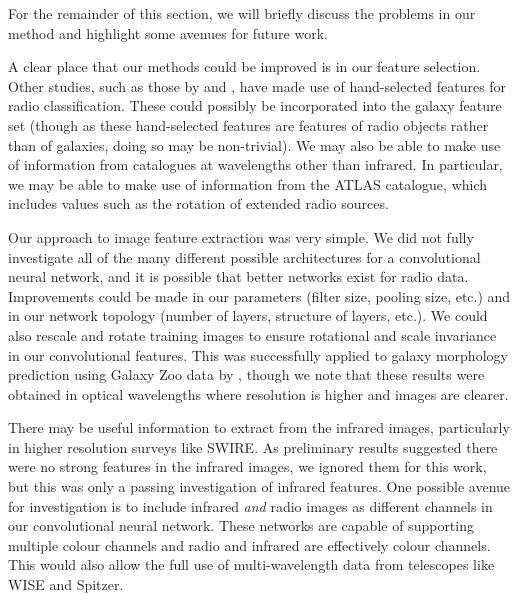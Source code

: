 
  For the remainder of this section, we will briefly discuss the problems in our
  method and highlight some avenues for future work.

  A clear place that our methods could be improved is in our feature selection.
  Other studies, such as those by \citet{proctor06} and \citet{fan15}, have made
  use of hand-selected features for radio classification. These could possibly
  be incorporated into the galaxy feature set (though as these hand-selected
  features are features of radio objects rather than of galaxies, doing so may
  be non-trivial). We may also be able to make use of information from
  catalogues at wavelengths other than infrared. In particular, we may be able
  to make use of information from the ATLAS catalogue, which includes values
  such as the rotation of extended radio sources.

  Our approach to image feature extraction was very simple. We did not fully
  investigate all of the many different possible architectures for a
  convolutional neural network, and it is possible that better networks exist
  for radio data. Improvements could be made in our parameters (filter size,
  pooling size, etc.) and in our network topology (number of layers, structure
  of layers, etc.). We could also rescale and rotate training images to ensure
  rotational and scale invariance in our convolutional features. This was
  successfully applied to galaxy morphology prediction using Galaxy Zoo data by
  \citet{dieleman15}, though we note that these results were obtained in optical
  wavelengths where resolution is higher and images are clearer.

  There may be useful information to extract from the infrared images,
  particularly in higher resolution surveys like SWIRE. As preliminary results
  suggested there were no strong features in the infrared images, we ignored
  them for this work, but this was only a passing investigation of infrared
  features. One possible avenue for investigation is to include infrared
  \emph{and} radio images as different channels in our convolutional neural
  network. These networks are capable of supporting multiple colour channels and
  radio and infrared are effectively colour channels. This would also allow the
  full use of multi-wavelength data from telescopes like WISE and Spitzer.

